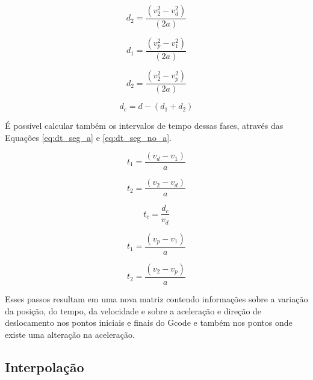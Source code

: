 \begin{equation}
    \label{eq:des_seg_a}
    d_2 = \frac{(v_2^2-v_d^2)}{(2 a)}
\end{equation}

\begin{equation}
    \label{eq:des_seg_a}
    d_1 = \frac{(v_p^2-v_1^2)}{(2 a)}
\end{equation}

\begin{equation}
    \label{eq:des_seg_a}
    d_2 = \frac{(v_2^2-v_p^2)}{(2 a)}
\end{equation}

\begin{equation}
    \label{eq:des_seg_no_a}
    d_c = d-(d_1+d_2)
\end{equation}

É possível calcular também os intervalos de tempo dessas fases, através das 
Equações \ref{eq:dt_seg_a} e \ref{eq:dt_seg_no_a}.

\begin{equation}
    \label{eq:dt_seg_a}
    t_1 = \frac{(v_d-v_1)}{a}
\end{equation}

\begin{equation}
    \label{eq:dt_seg_a}
    t_2 = \frac{(v_2-v_d)}{a}
\end{equation}

\begin{equation}
    \label{eq:dt_seg_no_a}
    t_c = \frac{d_c}{v_d}
\end{equation}

\begin{equation}
    \label{eq:dt_seg_a}
    t_1 = \frac{(v_p-v_1)}{a}
\end{equation}

\begin{equation}
    \label{eq:dt_seg_a}
    t_2 = \frac{(v_2-v_p)}{a}
\end{equation}


Esses passos resultam em uma nova matriz contendo informações
sobre a variação da posição, do tempo, da velocidade e sobre a aceleração e 
direção de deslocamento nos pontos iniciais e finais do Gcode e também nos pontos
onde existe uma alteração na aceleração.

\subsection{Interpolação}

